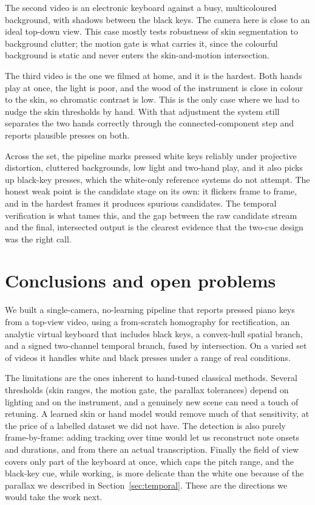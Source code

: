 \documentclass[11pt]{article}
\begin{document}
The second video is an electronic keyboard against a busy, multicoloured
background, with shadows between the black keys. The camera here is close to an
ideal top-down view. This case mostly tests robustness of skin segmentation to
background clutter; the motion gate is what carries it, since the colourful
background is static and never enters the skin-and-motion intersection.

The third video is the one we filmed at home, and it is the hardest. Both hands
play at once, the light is poor, and the wood of the instrument is close in colour
to the skin, so chromatic contrast is low. This is the only case where we had to
nudge the skin thresholds by hand. With that adjustment the system still
separates the two hands correctly through the connected-component step and reports
plausible presses on both.

Across the set, the pipeline marks pressed white keys reliably under projective
distortion, cluttered backgrounds, low light and two-hand play, and it also picks
up black-key presses, which the white-only reference systems do not attempt. The
honest weak point is the candidate stage on its own: it flickers frame to frame,
and in the hardest frames it produces spurious candidates. The temporal
verification is what tames this, and the gap between the raw candidate stream and
the final, intersected output is the clearest evidence that the two-cue design
was the right call.

\section{Conclusions and open problems}
We built a single-camera, no-learning pipeline that reports pressed piano keys
from a top-view video, using a from-scratch homography for rectification, an
analytic virtual keyboard that includes black keys, a convex-hull spatial branch,
and a signed two-channel temporal branch, fused by intersection. On a varied set
of videos it handles white and black presses under a range of real conditions.

The limitations are the ones inherent to hand-tuned classical methods. Several
thresholds (skin ranges, the motion gate, the parallax tolerances) depend on
lighting and on the instrument, and a genuinely new scene can need a touch of
retuning. A learned skin or hand model would remove much of that sensitivity, at
the price of a labelled dataset we did not have. The detection is also purely
frame-by-frame: adding tracking over time would let us reconstruct note onsets
and durations, and from there an actual transcription. Finally the field of view
covers only part of the keyboard at once, which caps the pitch range, and the
black-key cue, while working, is more delicate than the white one because of the
parallax we described in Section~\ref{sec:temporal}. These are the directions we
would take the work next.
\end{document}

